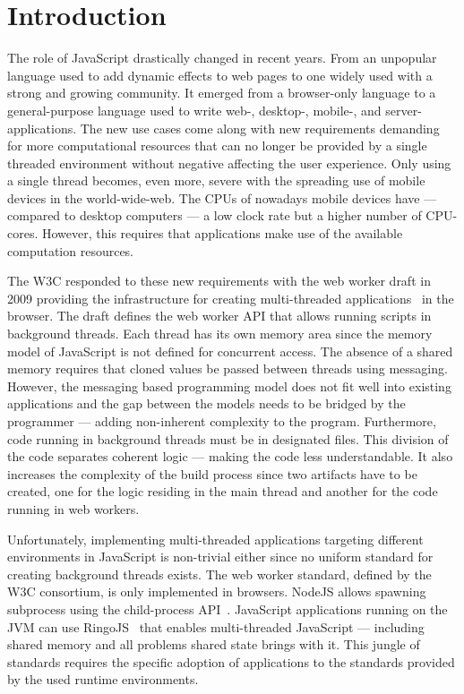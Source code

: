 \section{Introduction}\label{sec:introduction}
The role of JavaScript drastically changed in recent years. From an unpopular language used to add dynamic effects to web pages to one widely used with a strong and growing community. It emerged from a browser-only language to a general-purpose language used to write web-, desktop-, mobile-, and server-applications. The new use cases come along with new requirements demanding for more computational resources that can no longer be provided by a single threaded environment without negative affecting the user experience. Only using a single thread becomes, even more, severe with the spreading use of mobile devices in the world-wide-web. The CPUs of nowadays mobile devices have  --- compared to desktop computers --- a low clock rate but a higher number of CPU-cores. However, this requires that applications make use of the available computation resources. 

The W3C responded to these new requirements with the web worker draft in 2009 providing the infrastructure for creating multi-threaded applications~\cite{w3cWebWorker} in the browser. The draft defines the web worker API that allows running scripts in background threads. Each thread has its own memory area since the  memory model of JavaScript is not defined for concurrent access. The absence of a shared memory requires that cloned values be passed between threads using messaging. However, the messaging based programming model does not fit well into existing applications and the gap between the models needs to be bridged by the programmer --- adding non-inherent complexity to the program. Furthermore, code running in background threads must be in designated files. This division of the code separates coherent logic --- making the code less understandable. It also increases the complexity of the build process since two artifacts have to be created, one for the logic residing in the main thread and another for the code running in web workers. 

Unfortunately, implementing multi-threaded applications targeting different environments in JavaScript is non-trivial either since no uniform standard for creating background threads exists. The web worker standard, defined by the W3C consortium, is only implemented in browsers. NodeJS allows spawning subprocess using the child-process API~\cite{childProcess}. JavaScript applications running on the JVM can use RingoJS~\cite{RingoJS} that enables multi-threaded JavaScript --- including shared memory and all problems shared state brings with it. This jungle of standards requires the specific adoption of applications to the standards provided by the used runtime environments.

